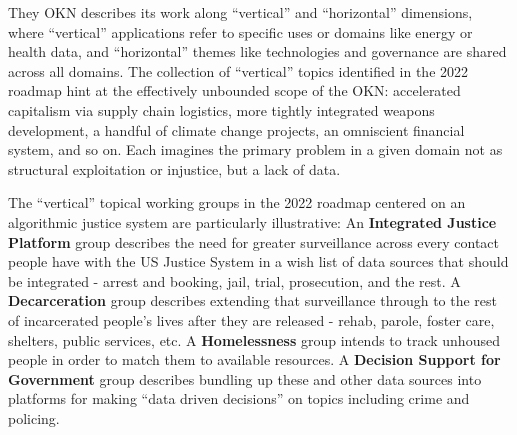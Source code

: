 They OKN describes its work along ``vertical'' and ``horizontal''
dimensions, where ``vertical'' applications refer to specific uses or
domains like energy or health data, and ``horizontal'' themes like
technologies and governance are shared across all domains. The
collection of ``vertical'' topics identified in the 2022 roadmap hint at
the effectively unbounded scope of the OKN: accelerated capitalism via
supply chain logistics, more tightly integrated weapons development, a
handful of climate change projects, an omniscient financial system, and
so on. Each imagines the primary problem in a given domain not as
structural exploitation or injustice, but a lack of data.

The ``vertical'' topical working groups in the 2022 roadmap centered on
an algorithmic justice system are particularly illustrative: An
\textbf{Integrated Justice Platform} group describes the need for
greater surveillance across every contact people have with the US
Justice System in a wish list of data sources that should be integrated
- arrest and booking, jail, trial, prosecution, and the rest. A
\textbf{Decarceration} group describes extending that surveillance
through to the rest of incarcerated people's lives after they are
released - rehab, parole, foster care, shelters, public services, etc. A
\textbf{Homelessness} group intends to track unhoused people in order to
match them to available resources. A \textbf{Decision Support for
Government} group
describes bundling up these and other data sources into platforms for
making ``data driven decisions'' on topics including crime and policing.

